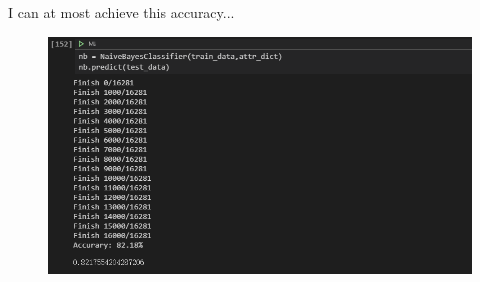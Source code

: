 \documentclass[a4paper, 11pt]{article}
\begin{document}
I can at most achieve this accuracy...
\begin{figure}[H]
\centering
\includegraphics[width=\linewidth]{result.png}
\end{figure}
\end{document}
